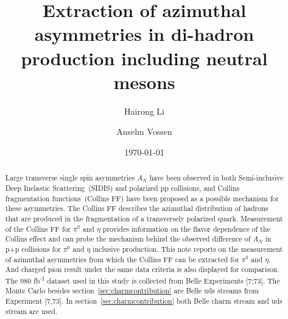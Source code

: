 \documentclass[english,notitlepage,12pt,a4paper]{article}
\begin{document}
\thispagestyle{fancy}

\title{Extraction of azimuthal asymmetries in di-hadron production including neutral mesons}
\author[1]{Hairong Li}
\author[1]{Anselm Vossen}

\date{\today}
\maketitle
\thispagestyle{fancy}
\begin{abstract}
\begin{small}%

Large transverse single spin asymmetries $A_N$ have been observed in both Semi-inclusive Deep Inelastic Scattering~(SIDIS) and polarized pp collisions, and Collins fragmentation functions~(Collins FF)  have been proposed as a possible mechanism for these asymmetries. The Collins FF describes the azimuthal distribution of hadrons that are produced in the fragmentation of a transversely polarized quark. Measurement of the Collins FF for $\pi^{0}$ and $\eta$ provides information on the flavor dependence of the Collins effect and can probe the mechanism behind the observed difference of $A_N$ in p+p collisions for $\pi^{0}$ and $\eta$ inclusive production. This note reports on the measurement of azimuthal asymmetries from which the Collins FF can be extracted for $\pi^{0}$ and $\eta$. And charged pion result under the same data criteria is also displayed for comparison. The $980$ fb\textsuperscript{-1} dataset used in this study is collected from Belle Experiments [7;73]. The Monte Carlo besides section~\ref{sec:charmcontribution} are Belle \textsc{}uds\textsc{} streams from Experiment [7,73]. In  section~\ref{sec:charmcontribution} both Belle \textsc{}charm\textsc{} stream and \textsc{}uds\textsc{} stream are used. 

\end{small}
\end{abstract}
\end{document}

